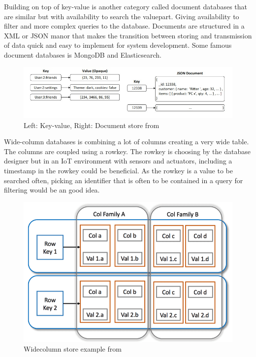 \documentclass[article,a4paper]{IEEEtran}
\begin{document}
\newline\newline
Building on top of key-value is another category called document databases that are similar but with availability to search the valuepart. Giving availability to filter and more complex queries to the database. Documents are structured in a XML or JSON manor that makes the transition between storing and transmission of data quick and easy to implement for system development. Some famous document databases is MongoDB and Elasticsearch.
\begin{figure}
    \includegraphics[width=\columnwidth]{keyvaluedocument.jpg} 
    \caption{ Left: Key-value, Right: Document store from \cite{Databasesurvey} }
    \label{fig4: Example Key-value and Document stores }   
\end{figure}  
\newline\newline
Wide-column databases is combining a lot of columns creating a very wide table. The columns are coupled using a rowkey. The rowkey is choosing by the database designer but in an IoT environment with sensors and actuators, including a timestamp in the rowkey could be beneficial. As the rowkey is a value to be searched often, picking an identifier that is often to be contained in a query for filtering would be an good idea. \newline
\begin{figure}
    \includegraphics[width=\columnwidth]{widecolumn.png} 
    \caption{ Widecolumn store example from \cite{wide-column} }
    \label{fig5: Example Wide-column stores }   
\end{figure}
\end{document}
